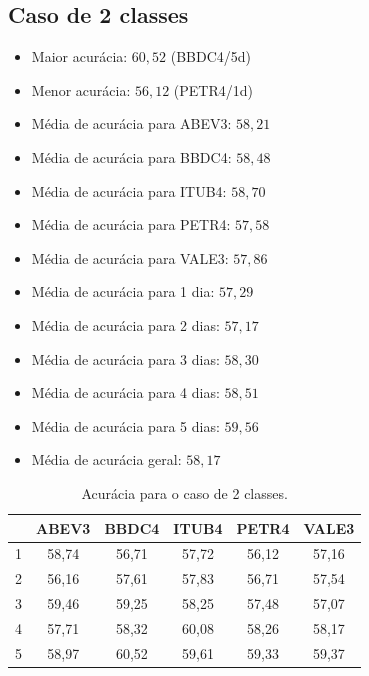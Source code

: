 \documentclass[grad,numbers]{coppe}
\begin{document}
			\subsection{Caso de 2 classes}
				\begin{itemize}
	 				\item Maior acurácia: $60,52$ (BBDC4/5d)
	 				\item Menor acurácia: $56,12$ (PETR4/1d)
	 				\item Média de acurácia para ABEV3: $58,21$
	 				\item Média de acurácia para BBDC4: $58,48$
	 				\item Média de acurácia para ITUB4: $58,70$
	 				\item Média de acurácia para PETR4: $57,58$
	 				\item Média de acurácia para VALE3: $57,86$
	 				\item Média de acurácia para 1 dia: $57,29$
	 				\item Média de acurácia para 2 dias: $57,17$
	 				\item Média de acurácia para 3 dias: $58,30$
	 				\item Média de acurácia para 4 dias: $58,51$
	 				\item Média de acurácia para 5 dias: $59,56$
	 				\item Média de acurácia geral: $58,17$
	 			\end{itemize}
	 			\begin{table}[h]
	 				\caption{Acurácia para o caso de 2 classes.}
	 				\label{tab:2c_ac_analysis}
	 				\centering
	 				{\footnotesize
	 					\begin{tabular}{|c|c|c|c|c|c|}
	 						\hline
	 						\diagbox[linewidth=0.2pt, width=\dimexpr \textwidth/10+2\tabcolsep\relax, height=0.8cm]{Dias}{Ativo}
	 						& ABEV3 & BBDC4 & ITUB4 & PETR4 & VALE3\\
	 						\hline
	 						1 & 58,74 & 56,71 & 57,72 & 56,12 & 57,16 \\
	 						2 & 56,16 & 57,61 & 57,83 & 56,71 & 57,54 \\
	 						3 & 59,46 & 59,25 & 58,25 & 57,48 & 57,07 \\
	 						4 & 57,71 & 58,32 & 60,08 & 58,26 & 58,17 \\
	 						5 & 58,97 & 60,52 & 59,61 & 59,33 & 59,37 \\
	 						\hline
	 				\end{tabular}}
	 			\end{table}
\end{document}
